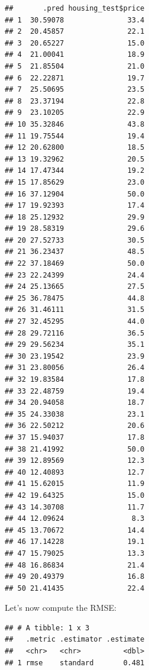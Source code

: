 \documentclass[]{gitbook}
\newenvironment{Shaded}{\begin{snugshade}}{\end{snugshade}}
\newcommand{\KeywordTok}[1]{\textcolor[rgb]{0.13,0.29,0.53}{\textbf{#1}}}
\newcommand{\NormalTok}[1]{#1}
\newcommand{\OperatorTok}[1]{\textcolor[rgb]{0.81,0.36,0.00}{\textbf{#1}}}
\newcommand{\StringTok}[1]{\textcolor[rgb]{0.31,0.60,0.02}{#1}}
\begin{document}
\begin{verbatim}
##       .pred housing_test$price
## 1  30.59078               33.4
## 2  20.45857               22.1
## 3  20.65227               15.0
## 4  21.00041               18.9
## 5  21.85504               21.0
## 6  22.22871               19.7
## 7  25.50695               23.5
## 8  23.37194               22.8
## 9  23.10205               22.9
## 10 35.32846               43.8
## 11 19.75544               19.4
## 12 20.62800               18.5
## 13 19.32962               20.5
## 14 17.47344               19.2
## 15 17.85629               23.0
## 16 37.12904               50.0
## 17 19.92393               17.4
## 18 25.12932               29.9
## 19 28.58319               29.6
## 20 27.52733               30.5
## 21 36.23437               48.5
## 22 37.18469               50.0
## 23 22.24399               24.4
## 24 25.13665               27.5
## 25 36.78475               44.8
## 26 31.46111               31.5
## 27 32.45295               44.0
## 28 29.72116               36.5
## 29 29.56234               35.1
## 30 23.19542               23.9
## 31 23.80056               26.4
## 32 19.83584               17.8
## 33 22.48759               19.4
## 34 20.94058               18.7
## 35 24.33038               23.1
## 36 22.50212               20.6
## 37 15.94037               17.8
## 38 21.41992               50.0
## 39 12.89569               12.3
## 40 12.40893               12.7
## 41 15.62015               11.9
## 42 19.64325               15.0
## 43 14.30708               11.7
## 44 12.09624                8.3
## 45 13.70672               14.4
## 46 17.14228               19.1
## 47 15.79025               13.3
## 48 16.86834               21.4
## 49 20.49379               16.8
## 50 21.41435               22.4
\end{verbatim}

Let's now compute the RMSE:

\begin{Shaded}
\end{Shaded}

\begin{verbatim}
## # A tibble: 1 x 3
##   .metric .estimator .estimate
##   <chr>   <chr>          <dbl>
## 1 rmse    standard       0.481
\end{verbatim}
\end{document}
